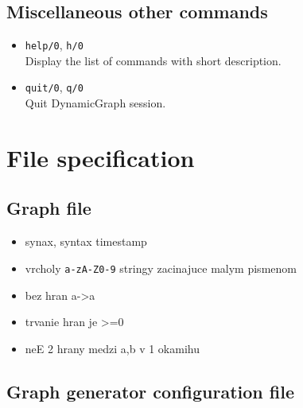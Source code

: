 \documentclass[11pt, a4paper,draft]{article}
\newcommand{\pl}[1]{\texttt{#1}} %
\theoremstyle{plain}
\theoremstyle{definition}
\theoremstyle{remark}
\begin{document}
\subsection{Miscellaneous other commands}

\begin{itemize}
\item \pl{help/0}, \pl{h/0} \\
Display the list of commands with short description.

\item \pl{quit/0}, \pl{q/0} \\
Quit DynamicGraph session.
\end{itemize}

\section{File specification}
\label{sec:files}

\subsection{Graph file}
\label{sec:files-graph}
\begin{itemize}
    \item synax, syntax timestamp
    \item vrcholy \texttt{a-zA-Z0-9} stringy zacinajuce malym pismenom
    \item bez hran a->a
    \item trvanie hran je >=0
    \item neE 2 hrany medzi a,b v 1 okamihu
\end{itemize}

\subsection{Graph generator configuration file}
\label{sec:files-generator}
\end{document}
